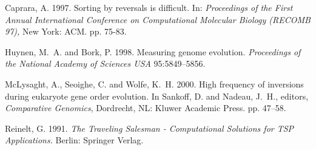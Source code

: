 \documentclass[twoside]{article}
\begin{document}
\footnotesize
 \begin{thebibliography}{99}

 Caprara, A. 1997. Sorting by reversals is difficult. In: {\em
Proceedings of the First Annual International Conference on Computational
Molecular Biology (RECOMB 97),} New York: ACM.  pp. 75-83.

 Huynen, M.~A. and Bork, P. 1998. Measuring genome evolution. {\em
Proceedings of the National Academy of Sciences USA}
  95:5849--5856.

McLysaght, A., Seoighe, C. and Wolfe, K.~H. 2000. High frequency
of inversions during eukaryote gene order evolution.     In Sankoff, D. and
Nadeau, J.~H., editors, {\em Comparative Genomics},  Dordrecht, NL: Kluwer
Academic Press. pp. 47--58.

 Reinelt, G. 1991. {\em The Traveling Salesman - Computational
Solutions for TSP Applications.} Berlin: Springer Verlag.

\end{thebibliography}
\end{document}
